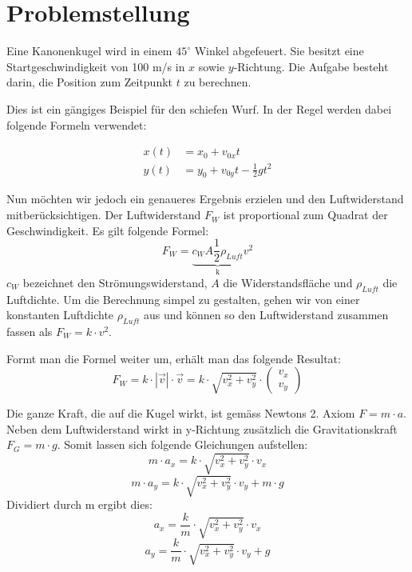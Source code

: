 \section{Problemstellung
\label{perturbation:section:problemstellung}}
Eine Kanonenkugel wird in einem $45^{\circ}$ Winkel abgefeuert. 
Sie besitzt eine Startgeschwindigkeit von 100 m/s in $x$ sowie $y$-Richtung. 
Die Aufgabe besteht darin, die Position zum Zeitpunkt $t$ zu berechnen.

Dies ist ein gängiges Beispiel für den schiefen Wurf. 
In der Regel werden dabei folgende Formeln verwendet:

\begin{equation}\label{eq:x_simple}
\begin{aligned}
    x(t) &= x_0 + v_{0x}t\\
    y(t) &= y_0 + v_{0y}t - \frac{1}{2}gt^2
\end{aligned}
\end{equation}


Nun möchten wir jedoch ein genaueres Ergebnis erzielen und den Luftwiderstand mitberücksichtigen.  
Der Luftwiderstand $F_W$ ist proportional zum Quadrat der Geschwindigkeit. Es gilt folgende Formel:
\[
F_W = \underbrace{c_WA\frac{1}{2}\rho_{Luft}}_\text{k}v^2
\]
$c_W$ bezeichnet den Strömungswiderstand, $A$ die Widerstandsfläche und $\rho_{Luft}$ die Luftdichte. 
Um die Berechnung simpel zu gestalten, gehen wir von einer konstanten Luftdichte $\rho_{Luft}$ aus und können so den Luftwiderstand zusammen fassen als $F_W = k \cdot v^2$.

Formt man die Formel weiter um, erhält man das folgende Resultat:
\[
F_W = k \cdot |\vec{v}| \cdot \vec{v} = k \cdot \sqrt{v_x^2 + v_y^2} \cdot \begin{pmatrix}v_x\\v_y\end{pmatrix}
\]

Die ganze Kraft, die auf die Kugel wirkt, ist gemäss Newtons 2. Axiom $F = m \cdot a$. 
Neben dem Luftwiderstand wirkt in y-Richtung zusätzlich die Gravitationskraft $F_G = m \cdot g$. 
Somit lassen sich folgende Gleichungen aufstellen:
\[
m \cdot a_x = k \cdot \sqrt{v_x^2 + v_y^2} \cdot v_x
\]
\[
m \cdot a_y = k \cdot \sqrt{v_x^2 + v_y^2} \cdot v_y + m \cdot g
\]
Dividiert durch m ergibt dies:
\[
a_x = \frac{k}{m} \cdot \sqrt{v_x^2 + v_y^2} \cdot v_x
\]
\[
a_y = \frac{k}{m} \cdot \sqrt{v_x^2 + v_y^2} \cdot v_y + g
\]

